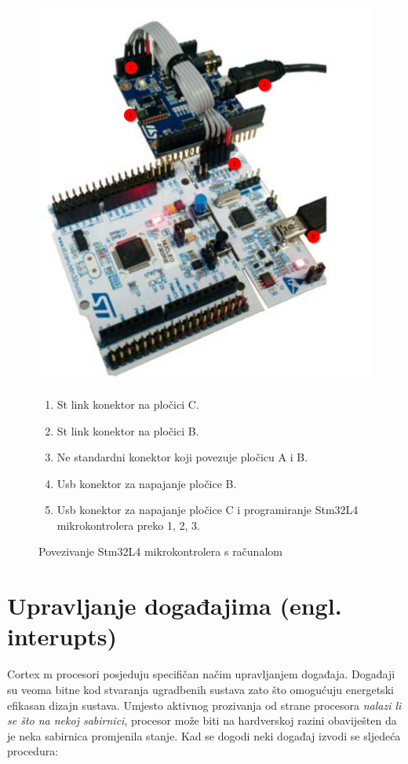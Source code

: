 \documentclass[times, utf8, diplomski]{diplomski}
\begin{document}
\begin{figure}[H]
  \includegraphics[scale=0.5]{connection_img.png}
  \centering
  \caption{Povezivanje Stm32L4 mikrokontrolera s računalom \cite{gettingstartedsensor}}
  \label{fig:prog}
  \begin{enumerate}
    \item St link konektor na pločici C.
    \item St link konektor na pločici B.
    \item Ne standardni konektor koji povezuje pločicu A i B.
    \item Usb konektor za napajanje pločice B.
    \item Usb konektor za napajanje pločice C i programiranje Stm32L4 mikrokontrolera preko 1, 2, 3.
  \end{enumerate}
\end{figure}

\newpage

\section{Upravljanje događajima (engl. interupts)}
Cortex m procesori posjeduju specifičan načim upravljanjem događaja. Događaji su veoma bitne kod stvaranja ugradbenih sustava zato što omogućuju energetski efikasan dizajn sustava.
Umjesto aktivnog prozivanja od strane procesora \textit{nalazi li se što na nekoj sabirnici}, procesor može biti na hardverskoj razini obaviješten da je neka sabirnica promjenila stanje.
Kad se dogodi neki događaj izvodi se sljedeća procedura:
\end{document}
